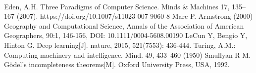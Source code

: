 \documentclass[square]{article}
\begin{document}
\hspace*{\fill} \\

%
%
\begin{thebibliography}{99}  
	
	Eden, A.H. Three Paradigms of Computer Science. Minds \& Machines 17, 135–167 (2007). https://doi.org/10.1007/s11023-007-9060-8
	Marc P. Armstrong (2000) Geography and Computational Science, Annals of the Association of American Geographers, 90:1, 146-156, DOI: 10.1111/0004-5608.00190
	LeCun Y, Bengio Y, Hinton G. Deep learning[J]. nature, 2015, 521(7553): 436-444.
	Turing, A.M.: Computing machinery and intelligence. Mind. 49, 433–460 (1950)
	Smullyan R M. Gödel's incompleteness theorems[M]. Oxford University Press, USA, 1992.
	
\end{thebibliography}
\end{document}
